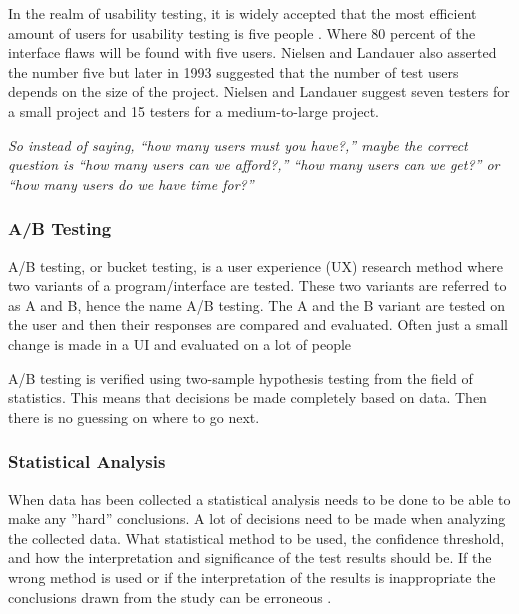 In the realm of usability testing, it is widely accepted that the most efficient amount of users for usability testing is five people \cite{virzi1992refining}. Where 80 percent of the interface flaws will be found with five users. Nielsen and Landauer also asserted the number five but later in 1993 suggested that the number of test users depends on the size of the project\cite{nielsen1993mathematical}. Nielsen and Landauer suggest seven testers for a small project and 15 testers for a medium-to-large project. 


\textit{
So instead of saying, “how many users must you have?,” maybe the correct question is “how many users can we afford?,” “how many users can we get?” or “how many users do we have time for?”
} \cite{lazar2017research} 








\subsubsection{A/B Testing}%
\label{sub:A/B Testing}
A/B testing, or bucket testing, is a user experience (UX) research method where two variants of a program/interface are tested. These two variants are referred to as A and B, hence the name A/B testing. The A and the B variant are tested on the user and then their responses are compared and evaluated. Often just a small change is made in a UI and evaluated on a lot of people 
 
A/B testing is verified using two-sample hypothesis testing from the field of statistics. This means that decisions be made completely based on data. Then there is no guessing on where to go next.




\subsubsection{Statistical Analysis}%
\label{sub:Statistical analysis}
When data has been collected a statistical analysis needs to be done to be able to make any ''hard'' conclusions. A lot of decisions need to be made when analyzing the collected data. What statistical method to be used, the confidence threshold, and how the interpretation and significance of the test results should be. If the wrong method is used or if the interpretation of the results is inappropriate the conclusions drawn from the study can be erroneous \cite{lazar2017research}. 


